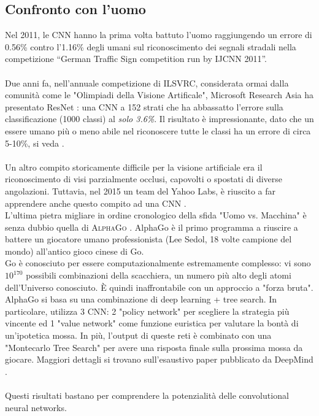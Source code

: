 \subsection{Confronto con l'uomo}
Nel 2011, le CNN hanno la prima volta battuto l’uomo raggiungendo un errore di 0.56\% contro l’1.16\% degli umani sul riconoscimento dei segnali stradali nella competizione “German Traffic Sign competition run by IJCNN 2011”. \\
\\
Due anni fa, nell'annuale competizione di ILSVRC, considerata ormai dalla comunità come le "Olimpiadi della Visione Artificale", Microsoft Research Asia ha presentato ResNet \parencite{resnet}: una CNN a 152 strati che ha abbassatto l'errore sulla classificazione (1000 classi) al \emph{solo 3.6\%}. Il risultato è impressionante, dato che un essere umano più o meno abile nel riconoscere tutte le classi ha un errore di circa 5-10\%, si veda \parencite{Wkarpa}. \\
\\
Un altro compito storicamente difficile per la visione artificiale era il riconoscimento di visi parzialmente occlusi, capovolti o spostati di diverse angolazioni. Tuttavia, nel 2015 un team del Yahoo Labs, è riuscito a far apprendere anche questo compito ad una CNN \parencite{WMit}.\\

L'ultima pietra migliare in ordine cronologico della sfida "Uomo vs. Macchina" è senza dubbio quella di \textsc{AlphaGo} \parencite{WAlphaGo}. AlphaGo è il primo programma a riuscire a battere un giocatore umano professionista (Lee Sedol, 18 volte campione del mondo) all'antico gioco cinese di Go. \\
Go è conosciuto per essere computazionalmente estremamente complesso: vi sono $10^{170}$ possibili combinazioni della scacchiera, un numero più alto degli atomi dell'Universo conosciuto. È quindi inaffrontabile con un approccio a "forza bruta". 
\\
AlphaGo si basa su una combinazione di deep learning + tree search. In particolare, utilizza 3 CNN: 2 "policy network" per scegliere la strategia più vincente ed 1 "value network" come funzione euristica per valutare la bontà di un'ipotetica mossa. In più, l'output di queste reti è combinato con una "Montecarlo Tree Search" per avere una risposta finale sulla prossima mossa da giocare. Maggiori dettagli si trovano sull'esaustivo paper pubblicato da DeepMind \parencite{AlphaGo}. \\
\\
Questi risultati bastano per comprendere la potenzialità delle convolutional neural networks.
